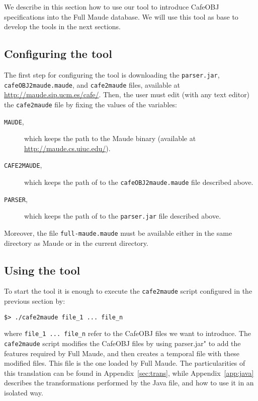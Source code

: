 
We describe in this section how to use our tool to introduce CafeOBJ specifications
into the Full Maude database. We will use this tool as base to develop the tools in
the next sections.

\subsection{Configuring the tool\label{subsec:c2m_config}}

The first step for configuring the tool is downloading the \verb"parser.jar",
\verb"cafeOBJ2maude.maude", and \verb"cafe2maude" files, available at
\url{http://maude.sip.ucm.es/cafe/}. Then, the user must edit
(with any text editor) the \verb"cafe2maude" file by fixing the values of the variables:
\begin{description}
\item[\texttt{MAUDE},] which keeps the path to the Maude binary (available at
\url{http://maude.cs.uiuc.edu/}).

\item[\texttt{CAFE2MAUDE},] which keeps the path of to the \verb"cafeOBJ2maude.maude"
file described above.

\item[\texttt{PARSER},] which keeps the path of to the \verb"parser.jar"
file described above.
\end{description}

Moreover, the file \verb"full-maude.maude" must be available either in the same directory
as Maude or in the current directory.

\subsection{Using the tool\label{subsec:c2m_using}}

To start the tool it is enough to execute the \verb"cafe2maude" script configured in the
previous section by:

{\codesize
\begin{verbatim}
$> ./cafe2maude file_1 ... file_n
\end{verbatim}
}

\noindent
where \verb"file_1 ... file_n" refer to the CafeOBJ files we want to introduce.
The \verb"cafe2maude" script modifies the CafeOBJ files by using \verb""parser.jar"
to add the features required by Full Maude, and then creates a temporal file with
these modified files. This file is the one loaded by Full Maude. 
%
The particularities of this translation can be found in Appendix~\ref{sec:trans},
while Appendix~\ref{app:java} describes the transformations performed by the Java file,
and how to use it in an isolated way.

